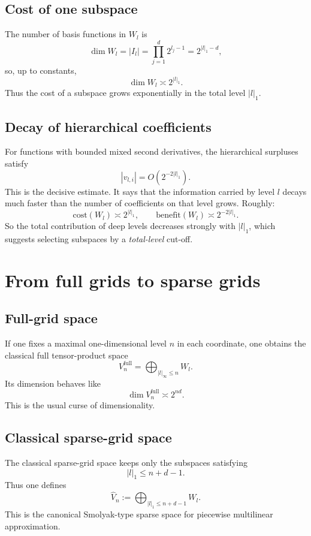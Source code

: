 \documentclass[11pt,a4paper]{report}
\begin{document}
\subsection{Cost of one subspace}

The number of basis functions in $W_l$ is
$$
\dim W_l = |I_l| = \prod_{j=1}^d 2^{l_j-1} = 2^{|l|_1-d},
$$
so, up to constants,
$$
\dim W_l \asymp 2^{|l|_1}.
$$
Thus the cost of a subspace grows exponentially in the total level $|l|_1$.

\subsection{Decay of hierarchical coefficients}

For functions with bounded mixed second derivatives, the hierarchical surpluses satisfy
$$
|v_{l,i}| = O(2^{-2|l|_1}).
$$
This is the decisive estimate. It says that the information carried by level $l$ decays much faster than the number of coefficients on that level grows. Roughly:
$$
\text{cost}(W_l)\asymp 2^{|l|_1},
\qquad
\text{benefit}(W_l)\asymp 2^{-2|l|_1}.
$$
So the total contribution of deep levels decreases strongly with $|l|_1$, which suggests selecting subspaces by a \emph{total-level} cut-off.

\section{From full grids to sparse grids}

\subsection{Full-grid space}

If one fixes a maximal one-dimensional level $n$ in each coordinate, one obtains the classical full tensor-product space
$$
V_n^{\mathrm{full}}
=
\bigoplus_{|l|_\infty\le n} W_l.
$$
Its dimension behaves like
$$
\dim V_n^{\mathrm{full}} \asymp 2^{nd}.
$$
This is the usual curse of dimensionality.

\subsection{Classical sparse-grid space}

The classical sparse-grid space keeps only the subspaces satisfying
$$
|l|_1 \le n+d-1.
$$
Thus one defines
$$
\widehat V_n
:=
\bigoplus_{|l|_1\le n+d-1} W_l.
$$
This is the canonical Smolyak-type sparse space for piecewise multilinear approximation.
\end{document}
